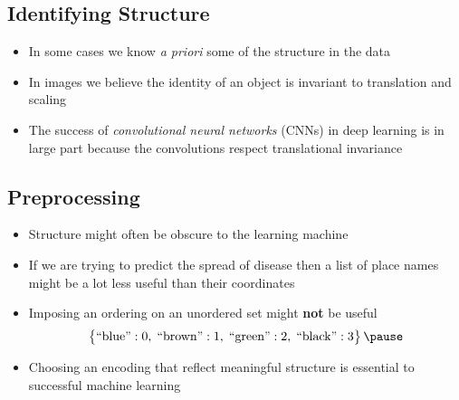 
\begin{slide}
\section{Identifying Structure}

\begin{PauseHighLight}
  \begin{itemize}
  \item In some cases we know \textit{a priori} some of the structure
    in the data\pause
  \item In images we believe the identity of an object is invariant to
    translation and scaling\pause
  \item The success of \textit{convolutional neural networks} (CNNs)
    in deep learning is in large part because the convolutions respect
    translational invariance\pause
  \end{itemize}
\end{PauseHighLight}

\end{slide}


\begin{slide}
\section{Preprocessing}

\begin{PauseHighLight}
  \begin{itemize}
  \item Structure might often be obscure to the learning machine\pause
  \item If we are trying to predict the spread of disease then a list
    of place names might be a lot less useful than their
    coordinates\pause
  \item Imposing an ordering on an unordered set might \textbf{not} be useful
    \begin{align*}
      \left\{\strut \text{``blue''}:0,\;\text{``brown''}:1,\;
      \text{``green''}:2,\;\text{``black''}:3 \right\}\pause
    \end{align*}
  \item Choosing an encoding that reflect meaningful structure is
    essential to successful machine learning\pause
  \end{itemize}
\end{PauseHighLight}

\end{slide}


